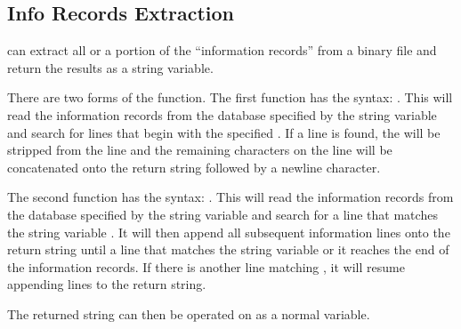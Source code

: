 \subsection{\exo{} Info Records Extraction} \aprepro{} can extract all
or a portion of the ``information records'' from a binary \exo{} file
and return the results as a string variable.

There are two forms of the function.  The first function has the
syntax:  .  This will read
the information records from the \exo{} database specified by the
string variable  and search for lines
that begin with the specified .  If a line is found, the
 will be stripped from the line and the remaining
characters on the line will be concatenated onto the return string
followed by a newline character.

The second function has the syntax: .
This will read the information records from the \exo{} database
specified by the string variable  and search for a line
that matches the string variable .  It will then append all
subsequent information lines onto the return string until a line that
matches the string variable  or it reaches the end of the
information records.  If there is another line matching ,
it will resume appending lines to the return string.

The returned string can then be operated on as a normal \aprepro{}
variable.
